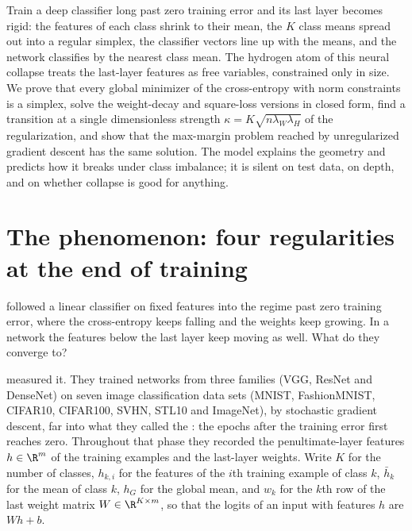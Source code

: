 \newcommand{\collapseone}{\mathbf 1}
\newcommand{\collapseYt}{\widetilde Y}
\newcommand{\collapseHb}{\bar H}
\newcommand{\collapsenuc}[1]{\norm{#1}_*}

\begin{refsection}

\begin{chaptersummary}
Train a deep classifier long past zero training error and its last layer becomes rigid: the features of each class shrink to their mean, the $K$ class means spread out into a regular simplex, the classifier vectors line up with the means, and the network classifies by the nearest class mean. The hydrogen atom of this neural collapse treats the last-layer features as free variables, constrained only in size. We prove that every global minimizer of the cross-entropy with norm constraints is a simplex, solve the weight-decay and square-loss versions in closed form, find a transition at a single dimensionless strength $\kappa=K\sqrt{n\lambda_W\lambda_H}$ of the regularization, and show that the max-margin problem reached by unregularized gradient descent has the same solution. The model explains the geometry and predicts how it breaks under class imbalance; it is silent on test data, on depth, and on whether collapse is good for anything.
\end{chaptersummary}

\section{The phenomenon: four regularities at the end of training}\label{sec:collapse:phenomenon}

 followed a linear classifier on fixed features into the regime past zero training error, where the cross-entropy keeps falling and the weights keep growing. In a network the features below the last layer keep moving as well. What do they converge to?

\Textcite{PapyanHanDonoho2020} measured it. They trained networks from three families (VGG, ResNet and DenseNet) on seven image classification data sets (MNIST, FashionMNIST, CIFAR10, CIFAR100, SVHN, STL10 and ImageNet), by stochastic gradient descent, far into what they called the : the epochs after the training error first reaches zero. Throughout that phase they recorded the penultimate-layer features $h\in\R^m$ of the training examples and the last-layer weights. Write $K$ for the number of classes, $h_{k,i}$ for the features of the $i$th training example of class $k$, $\bar h_k$ for the mean of class $k$, $h_G$ for the global mean, and $w_k$ for the $k$th row of the last weight matrix $W\in\R^{K\times m}$, so that the logits of an input with features $h$ are $Wh+b$.


\end{refsection}
